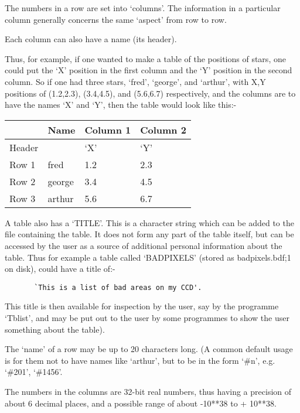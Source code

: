 The numbers in a row are set into `columns'. The information
in a particular column generally concerns the same `aspect' from
row to row.

Each column can also have a name (its header).

Thus, for example, if one wanted to make a table of the positions
of stars, one could put the `X' position in the first column and
the `Y' position in the second column. So if one had three stars,
`fred', `george', and `arthur', with X,Y positions of (1.2,2.3),
(3.4,4.5), and (5.6,6.7) respectively, and the columns are to
have the names `X' and `Y', then the table would look like
this:-

\hspace{4ex} \begin{tabular}[c]{|l|l|l|l|} \hline
          &  Name       & Column 1    & Column 2  \\ \hline
   Header &             &  `X'        &  `Y'      \\ \hline
   Row 1  &  fred       &  1.2        &  2.3      \\
   Row 2  &  george     &  3.4        &  4.5      \\
   Row 3  &  arthur     &  5.6        &  6.7      \\ \hline
\end{tabular}

A table also has a `TITLE'. This is a character string which
can be added to the file containing the table. It does not
form any part of the table itself, but can be accessed by the
user as a source of additional personal information about the
table. Thus for example a table called `BADPIXELS' (stored as
badpixels.bdf;1 on disk), could have a title of:-

\begin{verbatim}
       `This is a list of bad areas on my CCD'.
\end{verbatim}

This title is then available for inspection by the user, say by 
the programme `Tblist', and may be put out to the user by some 
programmes to show the user something about the table).

The `name' of a row may be up to 20 characters long. (A common
default usage is for them not to have names like `arthur', but to
be in the form `\#n', e.g.  `\#201', `\#1456'.

The numbers in the columns are 32-bit real numbers, thus having
a precision of about 6 decimal places, and a possible range
of about -10**38 to + 10**38.

